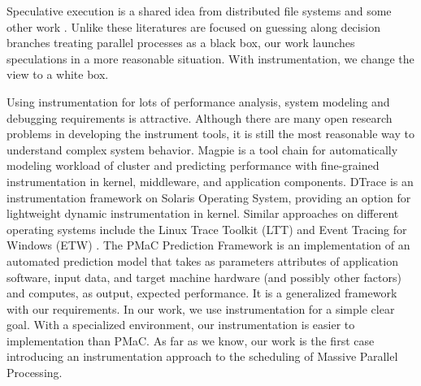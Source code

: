 Speculative execution is a shared idea from distributed file systems \cite{Nightingale:2006:SED:1189256.1189258} and some other work \cite{Su:2007:AIC:1294261.1294284} . Unlike these literatures are focused on guessing along decision branches treating parallel processes as a black box, our work launches speculations in a more reasonable situation. With instrumentation, we change the view to a white box.

Using instrumentation for lots of performance analysis, system modeling and debugging requirements is attractive. Although there are many open research problems in developing the instrument tools, it is still the most reasonable way to understand complex system behavior. Magpie \cite{Barham:2004:UMR:1251254.1251272} is a tool chain for automatically modeling workload of cluster and predicting performance with fine-grained instrumentation in kernel, middleware, and application components. DTrace \cite{Cantrill:2004:DIP:1247415.1247417} is an instrumentation framework on Solaris Operating System, providing an option for lightweight dynamic instrumentation in kernel. Similar approaches on different operating systems include the Linux Trace Toolkit (LTT) \cite{Yaghmour:2000:MCS:1267724.1267726} and Event Tracing for Windows (ETW) \cite{etw}. The PMaC Prediction Framework \cite{Carrington:2006:PPF:1134241.1708446} is an implementation of an automated prediction model that takes as parameters attributes of application software, input data, and target machine hardware (and possibly other factors) and computes, as output, expected performance. It is a generalized framework with our requirements. In our work, we use instrumentation for a simple clear goal. With a specialized environment, our instrumentation is easier to implementation than PMaC. As far as we know, our work is the first case introducing an instrumentation approach to the scheduling of Massive Parallel Processing.


